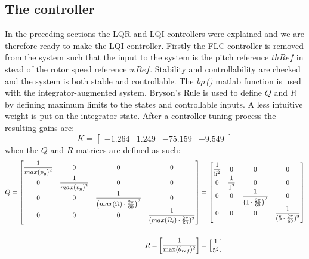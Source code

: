 \subsection{The controller} \label{sec:ctrl_thecontroller}
In the preceding sections the LQR and LQI controllers were explained and we are therefore ready to make the LQI controller. Firstly the FLC controller is removed from the system such that the input to the system is the pitch reference $ thRef $ in stead of the rotor speed reference $ wRef $. Stability and controllability are checked and the system is both stable and controllable. The \textit{lqr()} matlab function is used with the integrator-augmented system. Bryson's Rule is used to define $ Q $ and $ R $ by defining maximum limits to the states and controllable inputs. A less intuitive weight is put on the integrator state. After a controller tuning process the resulting gains are:
\begin{equation}\label{eq:lqi_K}
	K = \begin{bmatrix} -1.264 &  1.249 & -75.159 & -9.549 \end{bmatrix}
\end{equation}
when the $ Q $ and $ R $ matrices are defined as such:
\begin{equation}\label{eq:lqi_Q_and_R}
	\begin{split}
		Q = \begin{bmatrix}
			\dfrac{1}{max(p_y)^2}& 0 					& 0 															& 0 \cr
			0 					& \dfrac{1}{max(v_y)^2}	& 0 															& 0 \cr
			0 					& 0 					& \dfrac{1}{\left( max(\Omega) \cdot \frac{2 \pi}{60} \right)^2} & 0 \cr
			0 					& 0 					& 0 															& \dfrac{1}{(max(\Omega_i) \cdot \frac{2 \pi}{60})^2} \end{bmatrix} & = \begin{bmatrix}
			\dfrac{1}{5^2} 	&  	0 				&  0 										&  0 \cr
			0 				&  \dfrac{1}{1^2}	&  0 										&  0 \cr
			0 				&  0 				& \dfrac{1}{\left( 1 \cdot \frac{2 \pi}{60} \right)^2} 	&  0 \cr
			0 				&  0 				&  0 										&  \dfrac{1}{(5 \cdot \frac{2 \pi}{60})^2}
		\end{bmatrix} \\\\
		R = \begin{bmatrix} \dfrac{1}{\max(\theta_{ref})^2} \end{bmatrix} &= \begin{bmatrix} \dfrac{1}{5^2} \end{bmatrix}
	\end{split}
\end{equation}
